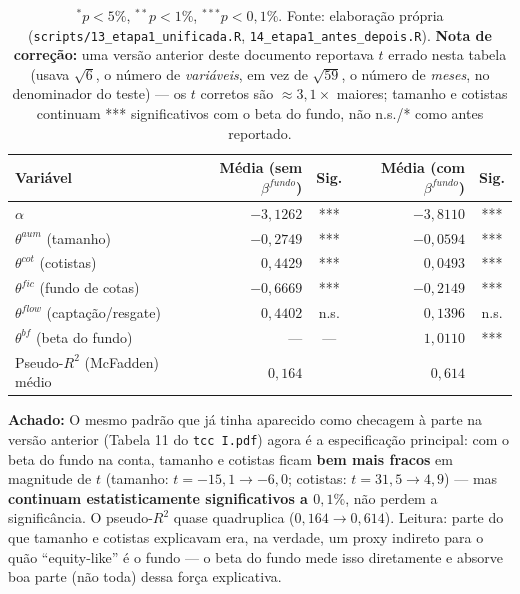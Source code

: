 \documentclass[11pt,a4paper]{article}
\newcommand{\aha}[1]{\par\vspace{4pt}\noindent\textbf{\color{vermelho}Achado:} #1\par\vspace{2pt}}
\begin{document}
\begin{table}[h]\centering\small
\caption{$\Theta$ logístico: antes e depois do beta do fundo (mesma amostra, 59 meses, teste
ingênuo de significância $t=\bar\theta/(\text{dp}(\theta)/\sqrt{59})$).}
\begin{tabular}{@{}lrcrc@{}}
\toprule
Variável & Média (sem $\beta^{fundo}$) & Sig. & Média (com $\beta^{fundo}$) & Sig. \\
\midrule
$\alpha$                   & $-3{,}1262$ & *** & $-3{,}8110$ & *** \\
$\theta^{aum}$ (tamanho)        & $-0{,}2749$ & *** & $-0{,}0594$ & *** \\
$\theta^{cot}$ (cotistas)       & $0{,}4429$  & *** & $0{,}0493$  & *** \\
$\theta^{fic}$ (fundo de cotas) & $-0{,}6669$ & *** & $-0{,}2149$ & *** \\
$\theta^{flow}$ (captação/resgate) & $0{,}4402$ & n.s. & $0{,}1396$ & n.s. \\
$\theta^{bf}$ (beta do fundo)   & ---          & ---& $1{,}0110$  & *** \\
\midrule
Pseudo-$R^2$ (McFadden) médio & $0{,}164$ & & $0{,}614$ & \\
\bottomrule
\end{tabular}
\caption*{\footnotesize $^{*}p<5\%$, $^{**}p<1\%$, $^{***}p<0{,}1\%$. Fonte: elaboração própria
(\texttt{scripts/13\_etapa1\_unificada.R}, \texttt{14\_etapa1\_antes\_depois.R}). \textbf{Nota de
correção:} uma versão anterior deste documento reportava $t$ errado nesta tabela (usava
$\sqrt{6}$, o número de \emph{variáveis}, em vez de $\sqrt{59}$, o número de \emph{meses}, no
denominador do teste) --- os $t$ corretos são $\approx3{,}1\times$ maiores; tamanho e cotistas
continuam *** significativos com o beta do fundo, não n.s./* como antes reportado.}
\end{table}

\aha{O mesmo padrão que já tinha aparecido como checagem à parte na versão anterior (Tabela 11
do \texttt{tcc I.pdf}) agora é a especificação principal: com o beta do fundo na conta, tamanho e
cotistas ficam \textbf{bem mais fracos} em magnitude de $t$ (tamanho: $t=-15{,}1\to-6{,}0$;
cotistas: $t=31{,}5\to4{,}9$) --- mas \textbf{continuam estatisticamente significativos a
$0{,}1\%$}, não perdem a significância. O pseudo-$R^2$ quase quadruplica
($0{,}164\to0{,}614$). Leitura: parte do que tamanho e cotistas explicavam era, na verdade, um
proxy indireto para o quão ``equity-like'' é o fundo --- o beta do fundo mede isso diretamente e
absorve boa parte (não toda) dessa força explicativa.}
\end{document}
